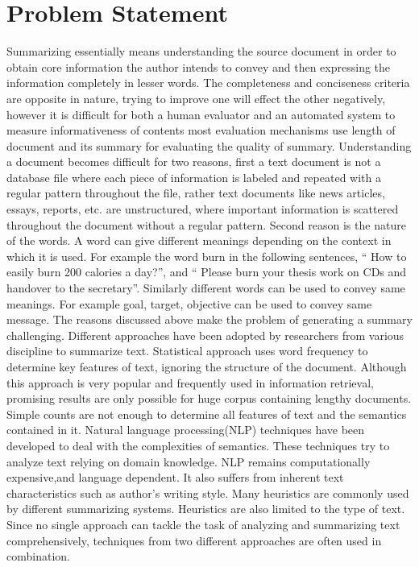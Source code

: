 \section{Problem Statement}
Summarizing essentially means understanding the source document in order to 
obtain core information the author intends to convey and then expressing the 
information 
completely in lesser words. The completeness and conciseness criteria are 
opposite in nature, trying to improve one will effect the other negatively, 
however it is difficult
for both a human evaluator and an automated system to measure informativeness 
of contents most evaluation mechanisms use length of document and its summary 
for evaluating 
the quality of summary. Understanding a document becomes difficult for two 
reasons, first a text document is not a database file where each piece of 
information is 
labeled and repeated with a regular pattern throughout the file, rather text 
documents like news articles, essays, reports, etc. are unstructured, where 
important 
information is scattered throughout the document without a regular pattern. 
Second reason is the nature of the words. A word can give different meanings 
depending on 
the context in which it is used. For example the word burn in the following 
sentences, `` How to easily burn 200 calories a day?'', and `` Please burn your 
thesis work on CDs and handover to the secretary''. Similarly different words 
can be used to convey same meanings. For example goal, target, objective can be 
used to convey
same message.
The reasons discussed above make the problem of generating a summary 
challenging.
Different approaches have been adopted by researchers from various discipline 
to summarize text. Statistical approach uses word frequency to determine key 
features of 
text, ignoring the structure of the document. Although this approach is very 
popular and frequently used in information retrieval, promising results are 
only possible for
huge corpus containing lengthy documents. Simple counts are not enough to 
determine all features of text and the semantics contained in it. Natural 
language processing(NLP) 
techniques have been developed to deal with the complexities of semantics. 
These techniques try to analyze text relying on domain knowledge. NLP remains 
computationally
expensive,and language dependent.
It also suffers from inherent text characteristics such as author's writing 
style. Many heuristics are commonly used by different summarizing systems.
Heuristics are also limited to the type of text. Since no single approach can 
tackle the task of analyzing and summarizing text comprehensively, techniques 
from two different
approaches are often used in combination.


